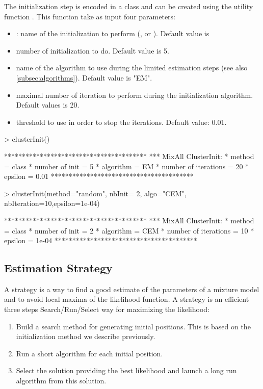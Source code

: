 \documentclass[shortnames,nojss,article]{jss}
\begin{document}
The initialization step is encoded in a  class and can be created
using the utility function . This function take as input
four parameters:
\begin{itemize}
\item {}: name of the initialization to perform (,
 or ). Default value is 
\item {} number of initialization to do.  Default value is 5.
\item {} name of the algorithm to use during the limited
estimation steps  (see also \ref{subsec:algorithms}). Default value is "EM".
\item {} maximal number of iteration to perform during the
initialization algorithm.  Default values is 20.
\item {} threshold to use in order to stop the iterations. Default
value: 0.01.
\end{itemize}

\begin{Schunk}
\begin{Sinput}
> clusterInit()
\end{Sinput}
\begin{Soutput}
****************************************
*** MixAll ClusterInit:
* method               =  class 
* number of init       =  5 
* algorithm            =  EM 
* number of iterations =  20 
* epsilon              =  0.01 
****************************************
\end{Soutput}
\begin{Sinput}
> clusterInit(method="random", nbInit= 2, algo="CEM", nbIteration=10,epsilon=1e-04)
\end{Sinput}
\begin{Soutput}
****************************************
*** MixAll ClusterInit:
* method               =  class 
* number of init       =  2 
* algorithm            =  CEM 
* number of iterations =  10 
* epsilon              =  1e-04 
****************************************
\end{Soutput}
\end{Schunk}

\subsection{Estimation Strategy}
\label{subsec:Strategy}

A strategy is a way to find a good estimate of the parameters of a mixture model
and to avoid local maxima of the likelihood function. A strategy is an efficient
three steps Search/Run/Select way for maximizing the likelihood:
\begin{enumerate}
\item Build a search method for generating  initial positions.
This is based on the initialization method we describe previously.
\item Run a short algorithm for each initial position.
\item Select the solution providing the best likelihood and launch a long
run algorithm from this solution.
\end{enumerate}
\end{document}
